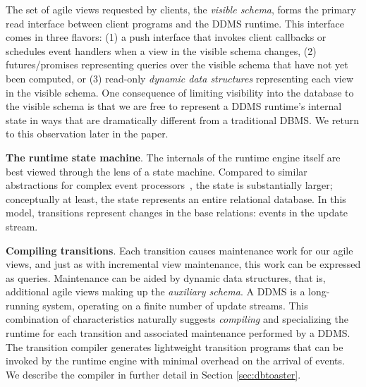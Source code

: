 The set of agile views requested by clients, the \textit{visible schema}, forms
the primary read interface between client programs and the DDMS runtime. This
interface comes in three flavors: (1) a push interface that invokes client
callbacks or schedules event handlers when a view in the visible schema changes,
(2) futures/promises representing queries over the visible schema that have not
yet been computed, or (3) read-only \textit{dynamic data structures}
representing each view in the visible schema.  One consequence of
limiting visibility into the database to the visible schema is that we are free
to represent a DDMS runtime's internal state in ways that are dramatically
different from a traditional DBMS.  We return to this observation later in the
paper.






{\bf The runtime state machine}\/.
The internals of the runtime engine itself are best viewed through the lens of a
state machine.  Compared to similar abstractions for complex event
processors~\cite{agrawal-sigmod:08, demers-sigmod:07}, the state is
substantially larger; conceptually at least, the state represents an entire
relational database.  In this model, transitions represent changes in the base
relations: events in the update stream.



{\bf Compiling transitions}\/.
Each transition causes maintenance work for our agile views, and just as
with incremental view maintenance, this work can be expressed as queries.
Maintenance can be aided by dynamic data structures, that is, additional agile
views making up the \textit{auxiliary schema}.
A DDMS is a long-running system, operating on a finite number of update streams.
This combination of characteristics naturally suggests \textit{compiling} and
specializing the runtime for each transition and associated maintenance
performed by a DDMS. The transition compiler generates lightweight transition
programs that can be invoked by the runtime engine with minimal overhead on the
arrival of events. We describe the compiler in further detail in Section
\ref{sec:dbtoaster}.










